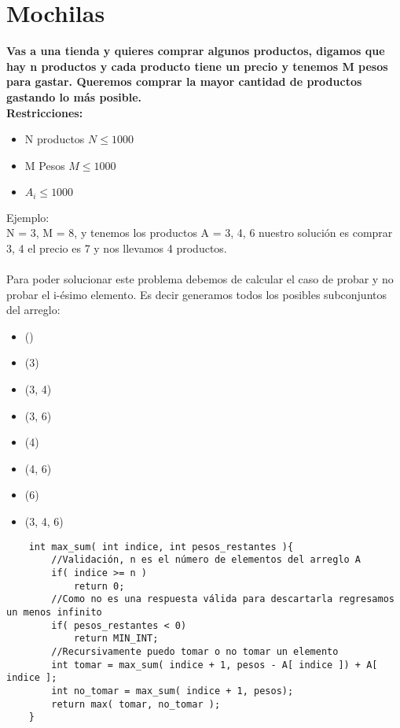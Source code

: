\section{Mochilas}
\textbf{Vas a una tienda y quieres comprar algunos productos, digamos que hay n productos y cada producto tiene un precio y tenemos M pesos para gastar. Queremos comprar la mayor cantidad de productos gastando lo más posible.\\}
\textbf{Restricciones:}
\begin{itemize}
    \item N productos $N \leq 1000$
    \item M Pesos $M \leq 1000$
    \item $A_{i} \leq 1000$
\end{itemize}
Ejemplo:\\
N = 3, M = 8, y tenemos los productos A = {3, 4, 6} nuestro solución es comprar {3, 4} el precio es 7 y nos llevamos 4 productos.\\\\
Para poder solucionar este problema debemos de calcular el caso de probar y no probar el i-ésimo elemento. Es decir generamos todos los posibles subconjuntos del arreglo:
\begin{itemize}
    \item ()
    \item (3)
    \item (3, 4)
    \item (3, 6)
    \item (4)
    \item (4, 6)
    \item (6)
    \item (3, 4, 6)
\end{itemize}
\begin{lstlisting}
    int max_sum( int indice, int pesos_restantes ){
        //Validación, n es el número de elementos del arreglo A
        if( indice >= n )
            return 0;
        //Como no es una respuesta válida para descartarla regresamos un menos infinito
        if( pesos_restantes < 0)
            return MIN_INT;
        //Recursivamente puedo tomar o no tomar un elemento
        int tomar = max_sum( indice + 1, pesos - A[ indice ]) + A[ indice ];
        int no_tomar = max_sum( indice + 1, pesos);
        return max( tomar, no_tomar );
    }
\end{lstlisting}

